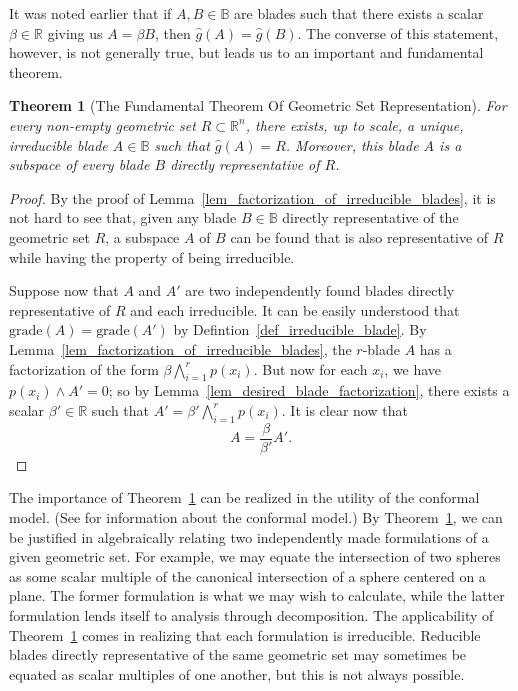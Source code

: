 \documentclass{birkjour}
\newtheorem{thm}{Theorem}[section]
\theoremstyle{definition}
\theoremstyle{remark}
\numberwithin{equation}{section}
\newcommand{\R}{\mathbb{R}}
\newcommand{\B}{\mathbb{B}}
\newcommand{\gh}{\hat{g}}
\newcommand{\grade}{\mbox{grade}}
\begin{document}
It was noted earlier that if $A,B\in\B$ are blades such that there exists a scalar $\beta\in\R$ giving us
$A=\beta B$, then $\gh(A)=\gh(B)$.  The converse of this statement, however,
is not generally true, but leads us to an important and fundamental theorem.

\begin{thm}[The Fundamental Theorem Of Geometric Set Representation]\label{thm_geo_set_rep}
For every non-empty geometric set $R\subset\R^n$, there exists, up to scale, a unique,
irreducible blade $A\in\B$ such that $\gh(A)=R$.  Moreover, this blade $A$ is a
subspace of every blade $B$ directly representative of $R$.
\end{thm}
\begin{proof}
By the proof of Lemma~\ref{lem_factorization_of_irreducible_blades}, it is not hard to see that, given any blade $B\in\B$ directly
representative of the geometric set $R$, a subspace $A$ of $B$ can be found that is
also representative of $R$ while having the property of being irreducible.

Suppose now that $A$ and $A'$ are two independently found blades directly representative of $R$
and each irreducible.  It can be easily understood that $\grade(A)=\grade(A')$ by Defintion~\ref{def_irreducible_blade}.
By Lemma~\ref{lem_factorization_of_irreducible_blades}, the $r$-blade $A$ has a factorization
of the form $\beta\bigwedge_{i=1}^r p(x_i)$.  But now for each $x_i$, we have $p(x_i)\wedge A'=0$; so by
Lemma~\ref{lem_desired_blade_factorization}, there exists a scalar $\beta'\in\R$ such that $A'=\beta'\bigwedge_{i=1}^r p(x_i)$.
It is clear now that
\begin{equation}
A = \frac{\beta}{\beta'}A'.
\end{equation}
\end{proof}

The importance of Theorem~\ref{thm_geo_set_rep} can be realized
in the utility of the conformal model.  (See \cite{Dorst07} for information about the conformal model.)
By Theorem~\ref{thm_geo_set_rep}, we can be justified in algebraically
relating two independently made formulations
of a given geometric set.  For example, we may equate the intersection of two spheres as some
scalar multiple of the canonical intersection of a sphere centered on a plane.  The former formulation
is what we may wish to calculate, while the latter formulation lends itself to analysis through decomposition.
The applicability of Theorem~\ref{thm_geo_set_rep} comes in realizing that each formulation is irreducible.
Reducible blades directly representative of the same geometric set may sometimes be equated as scalar multiples
of one another, but this is not always possible.
\end{document}
